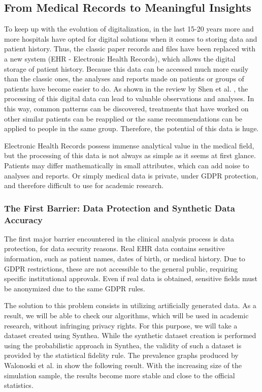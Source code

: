\subsection{From Medical Records to Meaningful Insights}

To keep up with the evolution of digitalization, in the last 15-20 years more and more hospitals have opted for digital solutions when it comes to storing data and patient history. Thus, the classic paper records and files have been replaced with a new system (EHR - Electronic Health Records), which allows the digital storage of patient history. Because this data can be accessed much more easily than the classic ones, the analyses and reports made on patients or groups of patients have become easier to do. As shown in the review by Shen et al. \cite{shen2025}, the processing of this digital data can lead to valuable observations and analyses. In this way, common patterns can be discovered, treatments that have worked on other similar patients can be reapplied or the same recommendations can be applied to people in the same group. Therefore, the potential of this data is huge.

Electronic Health Records possess immense analytical value in the medical field, but the processing of this data is not always as simple as it seems at first glance. Patients may differ mathematically in small attributes, which can add noise to analyses and reports. Or simply medical data is private, under GDPR protection, and therefore difficult to use for academic research.

\subsubsection*{The First Barrier: Data Protection and Synthetic Data Accuracy}

The first major barrier encountered in the clinical analysis process is data protection, for data security reasons. Real EHR data contains sensitive information, such as patient names, dates of birth, or medical history. Due to GDPR restrictions, these are not accessible to the general public, requiring specific institutional approvals. Even if real data is obtained, sensitive fields must be anonymized due to the same GDPR rules.

The solution to this problem consists in utilizing artificially generated data. As a result, we will be able to check our algorithms, which will be used in academic research, without infringing privacy rights. For this purpose, we will take a dataset created using Synthea. While the synthetic dataset creation is performed using the probabilistic approach in Synthea, the validity of such a dataset is provided by the statistical fidelity rule. The prevalence graphs produced by Walonoski et al. in \cite{walonoski2017} show the following result. With the increasing size of the simulation sample, the results become more stable and close to the official statistics.

